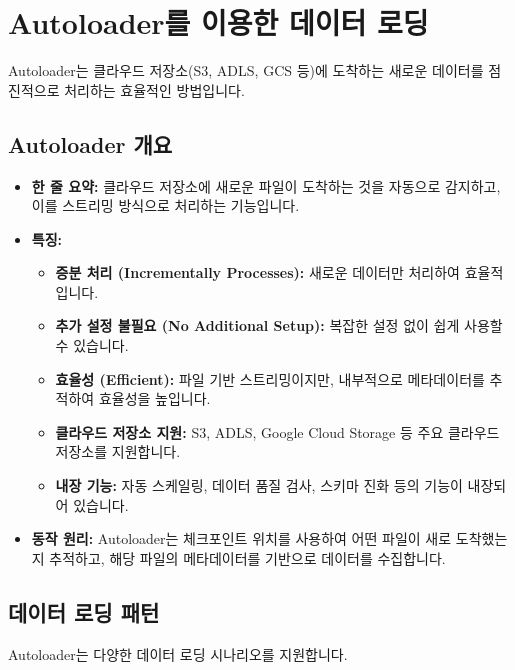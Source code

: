 \documentclass[11pt,a4paper]{article}
\theoremstyle{definition}
\begin{document}
\section{Autoloader를 이용한 데이터 로딩}
Autoloader는 클라우드 저장소(S3, ADLS, GCS 등)에 도착하는 새로운 데이터를 점진적으로 처리하는 효율적인 방법입니다.

\subsection{Autoloader 개요}
\begin{itemize}
    \item \textbf{한 줄 요약:} 클라우드 저장소에 새로운 파일이 도착하는 것을 자동으로 감지하고, 이를 스트리밍 방식으로 처리하는 기능입니다.
    \item \textbf{특징:}
    \begin{itemize}
        \item \textbf{증분 처리 (Incrementally Processes):} 새로운 데이터만 처리하여 효율적입니다.
        \item \textbf{추가 설정 불필요 (No Additional Setup):} 복잡한 설정 없이 쉽게 사용할 수 있습니다.
        \item \textbf{효율성 (Efficient):} 파일 기반 스트리밍이지만, 내부적으로 메타데이터를 추적하여 효율성을 높입니다.
        \item \textbf{클라우드 저장소 지원:} S3, ADLS, Google Cloud Storage 등 주요 클라우드 저장소를 지원합니다.
        \item \textbf{내장 기능:} 자동 스케일링, 데이터 품질 검사, 스키마 진화 등의 기능이 내장되어 있습니다.
    \end{itemize}
    \item \textbf{동작 원리:} Autoloader는 체크포인트 위치를 사용하여 어떤 파일이 새로 도착했는지 추적하고, 해당 파일의 메타데이터를 기반으로 데이터를 수집합니다.
\end{itemize}

\subsection{데이터 로딩 패턴}
Autoloader는 다양한 데이터 로딩 시나리오를 지원합니다.
\end{document}
